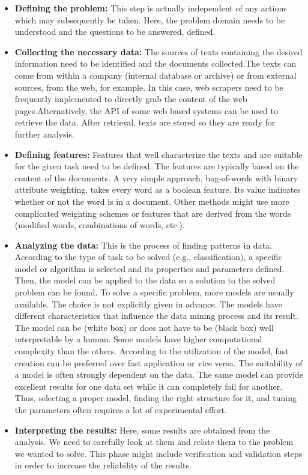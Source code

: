 \begin{itemize}
    \item \textbf{Defining the problem:} This step is actually independent of any actions which may subsequently be taken. Here, the problem domain needs to be understood and the questions to be answered, defined.
    
    \item \textbf{Collecting the necessary data:} The sources of texts containing the desired information need to be identified and the documents collected.The texts can come from within a company (internal database or archive) or from external sources, from the web, for example. In this case, web scrapers need to be frequently implemented to directly grab the content of the web pages.Alternatively, the API of some web based systems can be used to retrieve the data. After retrieval, texts are stored so they are ready for further analysis.
    
    \item \textbf{Defining features:} Features that well characterize the texts and are suitable for the given task need to be defined. The features are typically based on the content of the documents. A very simple approach, bag-of-words with binary attribute weighting, takes every word as a boolean feature. Its value indicates whether or not the word is in a document. Other methods might use more complicated weighting schemes or features that are derived from the words (modified words, combinations of words, etc.).
    
    \item \textbf{Analyzing the data:} This is the process of finding patterns in data. According to the type of task to be solved (e.g., classification), a specific model or algorithm is selected and its properties and parameters defined. Then, the model can be applied to the data so a solution to the solved problem can be found. To solve a specific problem, more models are usually available. The choice is not explicitly given in advance. The models have different characteristics that influence the data mining process and its result. The model can be (white box) or does not have to be (black box) well interpretable by a human. Some models have higher computational complexity than the others. According to the utilization of the model, fast creation can be preferred over fast application or vice versa. The suitability of a model is often strongly dependent on the data. The same model can provide excellent results for one data set while it can completely fail for another. Thus, selecting a proper model, finding the right structure for it, and tuning the parameters often requires a lot of experimental effort.
    
    \item \textbf{Interpreting the results:} Here, some results are obtained from the analysis. We need to carefully look at them and relate them to the problem we wanted to solve. This phase might include verification and validation steps in order to increase the reliability of the results.
\end{itemize}

